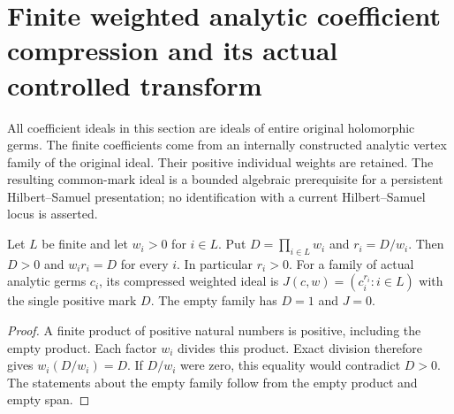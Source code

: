 \section{Finite weighted analytic coefficient compression and its actual controlled transform}
\label{sec:hironaka-actual-weighted-coefficient-compression}

All coefficient ideals in this section are ideals of entire original holomorphic germs.
The finite coefficients come from an internally constructed analytic vertex family of the
original ideal. Their positive individual weights are retained. The resulting common-mark
ideal is a bounded algebraic prerequisite for a persistent Hilbert--Samuel presentation;
no identification with a current Hilbert--Samuel locus is asserted.

\begin{lemma}
\label{hir:actual-weighted-coefficient-common-mark}
\leanok
Let $L$ be finite and let $w_i>0$ for $i\in L$. Put
$D=\prod_{i\in L}w_i$ and $r_i=D/w_i$. Then $D>0$ and
$w_ir_i=D$ for every $i$. In particular $r_i>0$.
For a family of actual analytic germs $c_i$, its compressed weighted ideal is
$J(c,w)=(c_i^{r_i}:i\in L)$ with the single positive mark $D$.
The empty family has $D=1$ and $J=0$.
\end{lemma}
\begin{proof}
A finite product of positive natural numbers is positive, including the empty
product. Each factor $w_i$ divides this product. Exact division therefore gives
$w_i(D/w_i)=D$. If $D/w_i$ were zero, this equality would contradict $D>0$.
The statements about the empty family follow from the empty product and empty span.
\end{proof}

